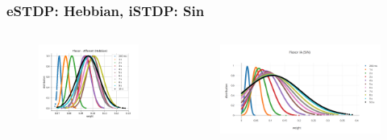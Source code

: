 \documentclass[12pt, aspectratio=169]{beamer}
\begin{document}
\begin{frame}
\frametitle{eSTDP: Hebbian, iSTDP: Sin}
\begin{columns}[c] %

\begin{figure}
\includegraphics[width=1\linewidth]{Gauss_Fl_Aff_Hebb}
\end{figure}
\begin{figure}
\includegraphics[width=1\linewidth]{Gauss_FlexorIA_sin}
\end{figure}
\end{columns}
\end{frame}

\end{document}
